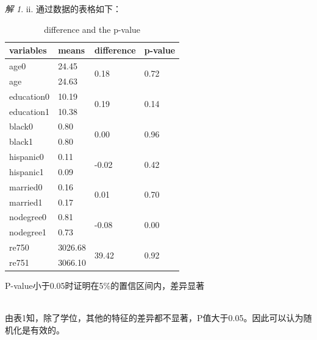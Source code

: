 \documentclass[a4paper]{ctexart}
\theoremstyle{remark}
\newtheorem*{solution}{解}
\begin{document}
\begin{itemize}
\begin{solution}
    ii. 通过数据的表格如下：
    \begin{table}[h]
        \centering
        \begin{threeparttable}%
            \begin{tabular}{llll}%
                \hline
                variables & means & difference & p-value \\   
                \hline
                age0 & 24.45 & \multirow{2}{*}{0.18}  & \multirow{2}{*}{0.72} \\
                age & 24.63 &   &\\
                education0 & 10.19 & \multirow{2}{*}{0.19} & \multirow{2}{*}{0.14}\\
                education1 & 10.38 &  & \\
                black0 & 0.80 & \multirow{2}{*}{0.00} & \multirow{2}{*}{0.96} \\
                black1 & 0.80 &  &  \\
                hispanic0 & 0.11 & \multirow{2}{*}{-0.02} & \multirow{2}{*}{0.42} \\
                hispanic1 & 0.09 &  &  \\
                married0 & 0.16 & \multirow{2}{*}{0.01} & \multirow{2}{*}{0.70} \\ 
                married1 & 0.17 &  &  \\    
                nodegree0 & 0.81 & \multirow{2}{*}{-0.08} & \multirow{2}{*}{0.00} \\
                nodegree1 & 0.73 &  &  \\
                re750 & 3026.68 & \multirow{2}{*}{39.42} & \multirow{2}{*}{0.92} \\
                re751 & 3066.10 &  &   \\
                \hline
            \end{tabular} 
            \begin{tablenotes}
                \footnotesize
                    \item[1]P-value小于0.05时证明在5\%的置信区间内，差异显著
            \end{tablenotes}
        \end{threeparttable}
        \caption{\label{font-table}  difference and the p-value  }
    \end{table}\\
    由表1知，除了学位，其他的特征的差异都不显著，P值大于0.05。因此可以认为随机化是有效的。\\


\end{solution}
\end{itemize}
\end{document}
